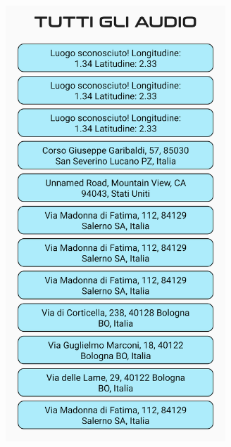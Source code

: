 \documentclass{article}
\begin{document}
\begin{minipage}[t]{0.35\textwidth}
    \centering
    \vspace*{0pt}
    \includegraphics[width=0.62\textwidth]{allaudiolist.png}\vspace*{40pt}
\end{minipage}
\end{document}
